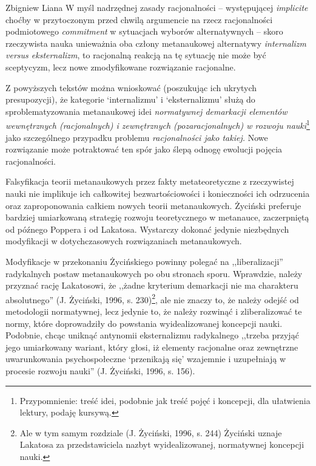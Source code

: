 \begin{artplenv}{Zbigniew Liana}
W myśl nadrzędnej zasady racjonalności -- występującej \textit{implicite} choćby w przytoczonym przed chwilą argumencie na
rzecz racjonalności podmiotowego \textit{commitment} w sytuacjach wyborów alternatywnych -- skoro rzeczywista nauka
unieważnia oba człony metanaukowej alternatywy \textit{internalizm versus eksternalizm}, to racjonalną reakcją na tę
sytuację nie może być sceptycyzm, lecz nowe zmodyfikowane rozwiązanie racjonalne.

Z powyższych tekstów można wnioskować (poszukując ich ukrytych presupozycji), że kategorie ‘internalizmu’ i
‘eksternalizmu’ służą do sproblematyzowania metanaukowej idei \textit{normatywnej demarkacji elementów wewnętrznych
	(racjonalnych) i zewnętrznych (pozaracjonalnych) w rozwoju nauki}\footnote{Przypomnienie: treść idei, podobnie jak
	treść pojęć i koncepcji, dla ułatwienia lektury, podaję kursywą.} jako szczególnego przypadku problemu
\textit{racjonalności jako takiej. }Nowe rozwiązanie może potraktować ten spór jako ślepą odnogę ewolucji pojęcia
racjonalności.

Falsyfikacja teorii metanaukowych przez fakty metateoretyczne z rzeczywistej nauki nie implikuje ich całkowitej
bezwartościowości i konieczności ich odrzucenia oraz zaproponowania całkiem nowych teorii metanaukowych. Życiński
preferuje bardziej umiarkowaną strategię rozwoju teoretycznego w metanauce, zaczerpniętą od późnego Poppera i od
Lakatosa. Wystarczy dokonać jedynie niezbędnych modyfikacji w dotychczasowych rozwiązaniach metanaukowych. 

Modyfikacje w przekonaniu Życińskiego powinny polegać na ,,liberalizacji'' radykalnych postaw metanaukowych po obu
stronach sporu. Wprawdzie, należy przyznać rację Lakatosowi, że ,,żadne kryterium demarkacji nie ma charakteru
absolutnego'' \label{ref:RNDlahtfGg0vv}(J. Życiński, 1996, s. 230)\footnote{Ale w tym samym rozdziale
	\label{ref:RNDU4zrzQHMRM}(J. Życiński, 1996, s. 244) Życiński uznaje Lakatosa za przedstawiciela nazbyt
	wyidealizowanej, normatywnej koncepcji nauki.}, ale nie znaczy to, że należy odejść od metodologii normatywnej, lecz
jedynie to, że należy rozwinąć i zliberalizować te normy, które doprowadziły do powstania wyidealizowanej koncepcji
nauki. Podobnie, chcąc uniknąć antynomii eksternalizmu radykalnego ,,trzeba przyjąć jego umiarkowany wariant, który
głosi, iż elementy racjonalne oraz zewnętrzne uwarunkowania psychospołeczne ‘przenikają się’ wzajemnie i uzupełniają w
procesie rozwoju nauki'' \label{ref:RND0qiCuFReRd}(J. Życiński, 1996, s. 156).


\end{artplenv}
